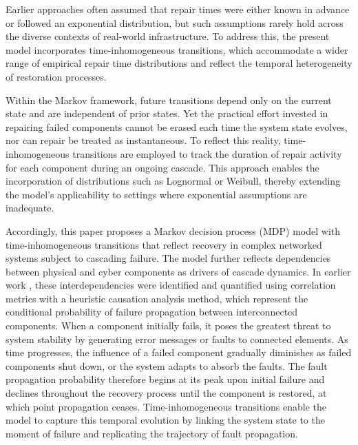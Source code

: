 \documentclass[runningheads]{llncs}
\begin{document}
Earlier approaches often assumed that repair times were either known in advance or followed an exponential distribution, but such assumptions rarely hold across the diverse contexts of real-world infrastructure. To address this, the present model incorporates time-inhomogeneous transitions, which accommodate a wider range of empirical repair time distributions and reflect the temporal heterogeneity of restoration processes.

Within the Markov framework, future transitions depend only on the current state and are independent of prior states. Yet the practical effort invested in repairing failed components cannot be erased each time the system state evolves, nor can repair be treated as instantaneous. To reflect this reality, time-inhomogeneous transitions are employed to track the duration of repair activity for each component during an ongoing cascade. This approach enables the incorporation of distributions such as Lognormal or Weibull, thereby extending the model’s applicability to settings where exponential assumptions are inadequate.

Accordingly, this paper proposes a Markov decision process (MDP) model with time-inhomogeneous transitions that  reflect recovery in complex networked systems subject to cascading failure. The model further reflects dependencies between physical and cyber components as drivers of cascade dynamics. In earlier work \cite{marashi_identification_2021}, these interdependencies were identified and quantified using correlation metrics with a heuristic causation analysis method, which represent the conditional probability of failure propagation between interconnected components. When a component initially fails, it poses the greatest threat to system stability by generating error messages or faults to connected elements. As time progresses, the influence of a failed component gradually diminishes as failed components shut down, or the system adapts to absorb the faults. The fault propagation probability therefore begins at its peak upon initial failure and declines throughout the recovery process until the component is restored, at which point propagation ceases. Time-inhomogeneous transitions enable the model to capture this temporal evolution by linking the system state to the moment of failure and replicating the trajectory of fault propagation.


\end{document}

